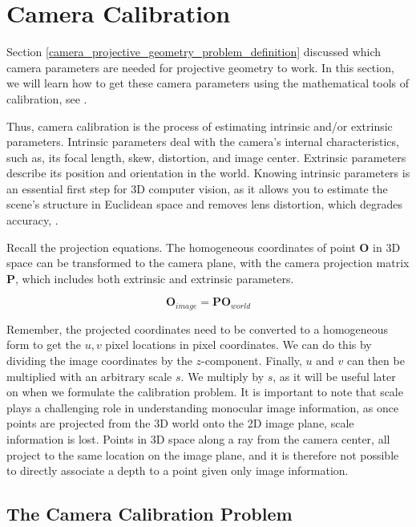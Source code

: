 \section{Camera Calibration}
\label{camera_calibration}

Section \ref{camera_projective_geometry_problem_definition} discussed which camera parameters are needed for projective
geometry to work. In this section, we will learn how to get these camera parameters using the mathematical tools
of calibration, see \cite{CameraCalibration1}. 

Thus, camera calibration is the process of estimating intrinsic and/or extrinsic parameters. 
Intrinsic parameters deal with the camera's internal characteristics, such as, its focal length, skew, distortion, and image center. 
Extrinsic parameters describe its position and orientation in the world. 
Knowing intrinsic parameters is an essential first step for 3D computer vision, as it allows you to estimate the scene's structure in Euclidean space and removes lens distortion, 
which degrades accuracy,  \cite{CameraCalibration1}. 

Recall the projection equations. The homogeneous coordinates of point $\mathbf{O}$ in 3D space can be transformed
to the camera plane, with the camera projection matrix $\mathbf{P}$, which includes both extrinsic
and extrinsic parameters. 

\begin{equation}
\mathbf{O}_{image} = \mathbf{P}\mathbf{O}_{world}
\end{equation}

Remember, the projected coordinates need to be converted to a homogeneous form
to get the $u,v$ pixel locations in pixel coordinates. 
We can  do this by dividing the image coordinates by the $z$-component. Finally, $u$ and $v$ can
then be multiplied with an arbitrary scale $s$. We multiply by $s$, as it will be useful
later on when we formulate the calibration problem. It is important to
note that scale plays a challenging role in understanding monocular
image information, as once points are projected from the 3D world onto
the 2D image plane, scale information is lost. Points in 3D space along
a ray from the camera center, all project to the same location
on the image plane, and it is therefore not possible to directly associate a depth to a point given only image information. 

\subsection{The Camera Calibration Problem}
\label{cam_calib_problem}

